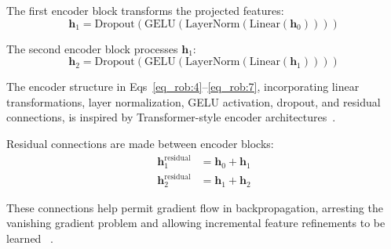 \documentclass[10pt,letterpaper]{article}
\begin{document}
                                                                         The first encoder block transforms the projected features:
                                                                         \begin{equation} \label{eq_rob:4}
                                                                             \mathbf{h}_1 = \text{Dropout}\left(\text{GELU}\left(\text{LayerNorm}\left(\text{Linear}(\mathbf{h}_0)\right)\right)\right)
                                                                             \end{equation}

                                                                             The second encoder block processes $\mathbf{h}_1$:
                                                                             \begin{equation} \label{eq_rob:5}
                                                                                 \mathbf{h}_2 = \text{Dropout}\left(\text{GELU}\left(\text{LayerNorm}\left(\text{Linear}(\mathbf{h}_1)\right)\right)\right)
                                                                                 \end{equation}

                                                                                 The encoder structure in Eqs~\eqref{eq_rob:4}--\eqref{eq_rob:7}, incorporating linear transformations, layer normalization, GELU activation, dropout, and residual connections, is inspired by Transformer-style encoder architectures~\cite{ref50}.

                                                                                 Residual connections are made between encoder blocks:
                                                                                 \begin{align}
                                                                                     \mathbf{h}_1^{\text{residual}} &= \mathbf{h}_0 + \mathbf{h}_1  \label{eq_rob:6}\\
                                                                                         \mathbf{h}_2^{\text{residual}} &= \mathbf{h}_1 + \mathbf{h}_2
                                                                                          \label{eq_rob:7}\end{align}

                                                                                         These connections help permit gradient flow in backpropagation, arresting the vanishing gradient problem and allowing incremental feature refinements to be learned ~\cite{ref50}.
\end{document}
